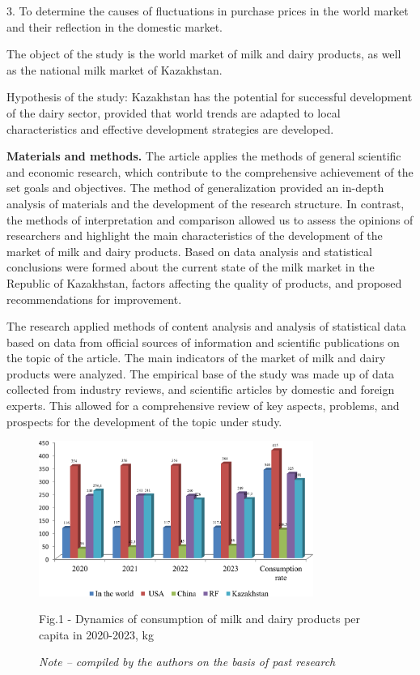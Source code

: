 \begin{multicols}{2}
3. To determine the causes of fluctuations in purchase prices in the
world market and their reflection in the domestic market.

The object of the study is the world market of milk and dairy products,
as well as the national milk market of Kazakhstan.

Hypothesis of the study: Kazakhstan has the potential for successful
development of the dairy sector, provided that world trends are adapted
to local characteristics and effective development strategies are
developed.

{\bfseries Materials and methods.} The article applies the methods of
general scientific and economic research, which contribute to the
comprehensive achievement of the set goals and objectives. The method of
generalization provided an in-depth analysis of materials and the
development of the research structure. In contrast, the methods of
interpretation and comparison allowed us to assess the opinions of
researchers and highlight the main characteristics of the development of
the market of milk and dairy products. Based on data analysis and
statistical conclusions were formed about the current state of the milk
market in the Republic of Kazakhstan, factors affecting the quality of
products, and proposed recommendations for improvement.

The research applied methods of content analysis and analysis of
statistical data based on data from official sources of information and
scientific publications on the topic of the article. The main indicators
of the market of milk and dairy products were analyzed. The empirical
base of the study was made up of data collected from industry reviews,
and scientific articles by domestic and foreign experts. This allowed
for a comprehensive review of key aspects, problems, and prospects for
the development of the topic under study.
\end{multicols}

\begin{figure}[H]
	\centering
	\includegraphics[width=0.8\textwidth]{media/ekon4/image1}
	\caption*{Fig.1 - Dynamics of consumption of milk and dairy products per capita in 2020-2023, kg}
	\caption*{\normalfont\emph{Note -- compiled by the authors on the basis of past research}}
\end{figure}

